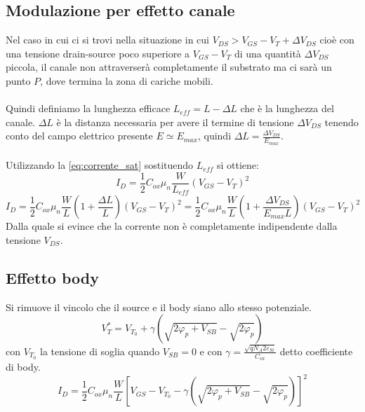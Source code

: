 \documentclass{article}
\begin{document}
\subsection*{Modulazione per effetto canale}
Nel caso in cui ci si trovi nella situazione in cui $V_{DS} > V_{GS} - V_T + \Delta V_{DS}$ cioè con una tensione drain-source poco superiore a $V_{GS} - V_T$ di una quantità $\Delta V_{DS}$ piccola, il canale non attraverserà completamente il substrato ma ci sarà un punto $P$, dove termina la zona di cariche mobili.\\
\\
Quindi definiamo la lunghezza efficace $L_{eff} = L - \Delta L$ che è la lunghezza del canale. $\Delta L$ è la distanza necessaria per avere il termine di tensione $\Delta V_{DS}$ tenendo conto del campo elettrico presente $E \simeq E_{max}$, quindi $\Delta L = \frac{\Delta V_{DS}}{E_{max}}$.\\
\\
Utilizzando la \eqref{eq:corrente_sat} sostituendo $L_{eff}$ si ottiene:
\begin{equation*}
I_D = \frac{1}{2} C_{ox} \mu_n \frac{W}{L_{eff}} (V_{GS} - V_T)^2
\end{equation*}
\begin{equation*}
I_D = \frac{1}{2} C_{ox} \mu_n \frac{W}{L} \left(1+\frac{\Delta L}{L} \right) (V_{GS} - V_T)^2 = \frac{1}{2} C_{ox} \mu_n \frac{W}{L} \left(1+\frac{\Delta V_{DS}}{E_{max} L} \right) (V_{GS} - V_T)^2
\end{equation*}
Dalla quale si evince che la corrente non è completamente indipendente dalla tensione $V_{DS}$.

\subsection*{Effetto body}\label{effetto body}
Si rimuove il vincolo che il source e il body siano allo stesso potenziale.
\begin{equation*}
V_T^* = V_{T_0} + \gamma \left( \sqrt{2\varphi_p + V_{SB}} - \sqrt{2\varphi_p} \right)
\end{equation*}
con $V_{T_0}$ la tensione di soglia quando $V_{SB} = 0$ e con $\gamma = \frac{\sqrt{qN_A 2\varepsilon_{Si}}}{C_{ox}}$ detto coefficiente di body.
\begin{equation*}
I_D = \frac{1}{2} C_{ox} \mu_n \frac{W}{L} \left[ V_{GS} - V_{T_0} - \gamma \left( \sqrt{2\varphi_p + V_{SB}} - \sqrt{2\varphi_p} \right) \right]^2
\end{equation*}
\end{document}
